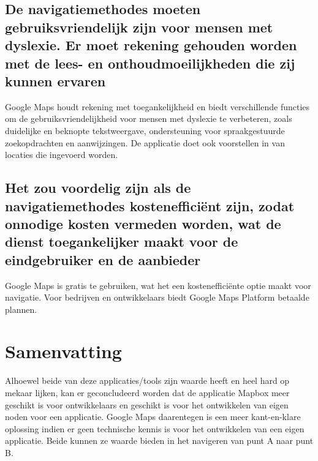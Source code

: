 \subsection*{De navigatiemethodes moeten gebruiksvriendelijk zijn voor mensen met dyslexie. Er moet rekening gehouden worden met de lees- en onthoudmoeilijkheden die zij kunnen ervaren}
Google Maps houdt rekening met toegankelijkheid en biedt verschillende functies om de gebruiksvriendelijkheid voor mensen met dyslexie te verbeteren, zoals duidelijke en beknopte tekstweergave, ondersteuning voor spraakgestuurde zoekopdrachten en aanwijzingen. De applicatie doet ook voorstellen in van locaties die ingevoerd worden.

\subsection*{Het zou voordelig zijn als de navigatiemethodes kostenefficiënt zijn, zodat onnodige kosten vermeden worden, wat de dienst toegankelijker maakt voor de eindgebruiker en de aanbieder}
Google Maps is gratis te gebruiken, wat het een kostenefficiënte optie maakt voor navigatie. Voor bedrijven en ontwikkelaars biedt Google Maps Platform betaalde plannen.

\section{Samenvatting}
\label{sec:samenvatting}
Alhoewel beide van deze applicaties/tools zijn waarde heeft en heel hard op mekaar lijken, kan er geconcludeerd worden dat de applicatie Mapbox meer geschikt is voor ontwikkelaars en geschikt is voor het ontwikkelen van eigen noden voor een applicatie. Google Maps daarentegen is een meer kant-en-klare oplossing indien er geen technische kennis is voor het ontwikkelen van een eigen applicatie. Beide kunnen ze waarde bieden in het navigeren van punt A naar punt B.







